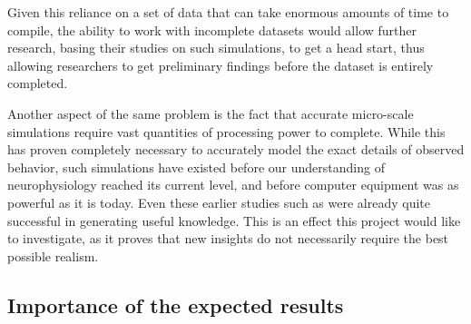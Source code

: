 \documentclass[a4paper,11pt]{article}
\begin{document}
Given this reliance on a set of data that can take enormous amounts of time to compile, the ability to work with incomplete datasets would allow further research, basing their studies on such simulations, to get a head start, thus allowing researchers to get preliminary findings before the dataset is entirely completed.

Another aspect of the same problem is the fact that accurate micro-scale simulations require vast quantities of processing power to complete. While this has proven completely necessary to accurately model the exact details of observed behavior, such simulations have existed before our understanding of neurophysiology reached its current level, and before computer equipment was as powerful as it is today. Even these earlier studies such as \citep{Kimura2005} were already quite successful in generating useful knowledge. This is an effect this project would like to investigate, as it proves that new insights do not necessarily require the best possible realism. 


\subsection{Importance of the expected results}
\end{document}
